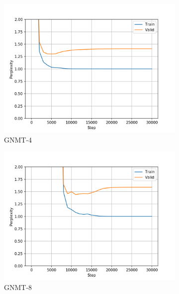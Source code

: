 \begin{figure}[H]
\begin{subfigure}{0.45\textwidth}
\includegraphics[width=\textwidth]{../results/monument2_2/run1/wmt16_gnmt_4_layer/ppls.png} 
\caption{GNMT-4}
\label{fig:monu2 gnmt4 ppl}
\end{subfigure}
\hfill
\begin{subfigure}{0.45\textwidth}
\includegraphics[width=\textwidth]{../results/monument2_2/run1/wmt16_gnmt_8_layer/ppls.png}
\caption{GNMT-8}
\label{fig:monu2 gnmt8 ppl}
\end{subfigure}
\hfill
\begin{subfigure}{0.45\textwidth}

\end{subfigure}
\end{figure}
